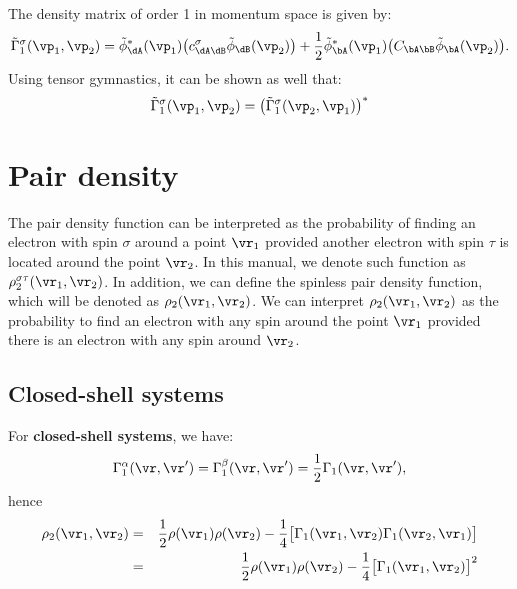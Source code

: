 The density matrix of order 1 in momentum space is given by:
%
\begin{equation}
   \tilde\Gamma_1^{\sigma}(\vp_1,\vp_2)=\tilde\phi_{\dA}^*(\vp_1)
   \big(c_{\dA\dB}^{\sigma}\tilde\phi_{\dB}(\vp_2)\big)
   +\frac{1}{2}\tilde\phi_{\bA}^*(\vp_1)\big(C_{\bA\bB}\tilde\phi_{\bA}(\vp_2)\big).
\end{equation}
%
Using tensor gymnastics, it can be shown as well that:
%
\begin{equation}\label{eq:conjproptg1Sp1p2}
   \tilde\Gamma_1^{\sigma}(\vp_1,\vp_2)=\big(\tilde\Gamma_1^{\sigma}(\vp_2,\vp_1)\big)^*
\end{equation}
%

\section{Pair density}
The pair density function can be interpreted as the probability of finding an electron
with spin $\sigma$
around a point $\vr_1$ provided another electron with spin $\tau$
is located around the point $\vr_2$. In this
manual, we denote such function as $\rho^{\sigma\tau}_2(\vr_1,\vr_2)$. In addition,
we can define the spinless pair density function, which
will be denoted as $\rho_2(\vr_1,\vr_2)$. We can interpret $\rho_2(\vr_1,\vr_2)$ as the
probability to find an electron with any spin around the point $\vr_1$ provided there
is an electron with any spin around $\vr_2$.
\subsection{Closed-shell systems}

For \textbf{closed-shell systems}, we have:
%
\begin{equation}\label{eq:gamma1ab4css}
	\Gamma_1^{\alpha}(\vr,\vr')=\Gamma_1^{\beta}(\vr,\vr')=
	\frac{1}{2}\Gamma_1(\vr,\vr'),
\end{equation}
%
hence
%
\begin{eqnarray}
	\rho_2(\vr_1,\vr_2) & = & \frac{1}{2}\rho(\vr_1)\rho(\vr_2)
	-\frac{1}{4}\big[\Gamma_1(\vr_1,\vr_2)\Gamma_1(\vr_2,\vr_1)\big]\\
	& = & \frac{1}{2}\rho(\vr_1)\rho(\vr_2)
	-\frac{1}{4}\big[\Gamma_1(\vr_1,\vr_2)\big]^2%
	\label{eq:rho2r1r2css}
\end{eqnarray}
%



